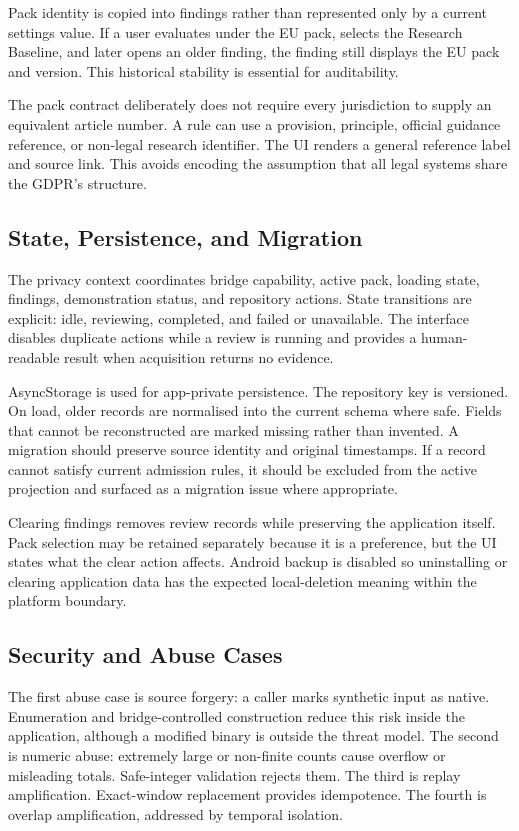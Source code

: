 Pack identity is copied into findings rather than represented only by a current settings value. If a user evaluates under the EU pack, selects the Research Baseline, and later opens an older finding, the finding still displays the EU pack and version. This historical stability is essential for auditability.

The pack contract deliberately does not require every jurisdiction to supply an equivalent article number. A rule can use a provision, principle, official guidance reference, or non-legal research identifier. The UI renders a general reference label and source link. This avoids encoding the assumption that all legal systems share the GDPR's structure.

\subsection{State, Persistence, and Migration}

The privacy context coordinates bridge capability, active pack, loading state, findings, demonstration status, and repository actions. State transitions are explicit: idle, reviewing, completed, and failed or unavailable. The interface disables duplicate actions while a review is running and provides a human-readable result when acquisition returns no evidence.

AsyncStorage is used for app-private persistence. The repository key is versioned. On load, older records are normalised into the current schema where safe. Fields that cannot be reconstructed are marked missing rather than invented. A migration should preserve source identity and original timestamps. If a record cannot satisfy current admission rules, it should be excluded from the active projection and surfaced as a migration issue where appropriate.

Clearing findings removes review records while preserving the application itself. Pack selection may be retained separately because it is a preference, but the UI states what the clear action affects. Android backup is disabled so uninstalling or clearing application data has the expected local-deletion meaning within the platform boundary.

\subsection{Security and Abuse Cases}

The first abuse case is source forgery: a caller marks synthetic input as native. Enumeration and bridge-controlled construction reduce this risk inside the application, although a modified binary is outside the threat model. The second is numeric abuse: extremely large or non-finite counts cause overflow or misleading totals. Safe-integer validation rejects them. The third is replay amplification. Exact-window replacement provides idempotence. The fourth is overlap amplification, addressed by temporal isolation.

